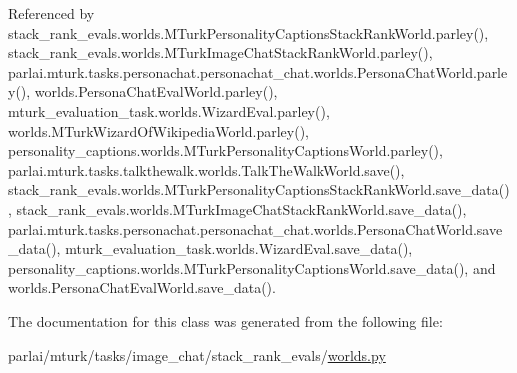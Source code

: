 Referenced by stack\+\_\+rank\+\_\+evals.\+worlds.\+M\+Turk\+Personality\+Captions\+Stack\+Rank\+World.\+parley(), stack\+\_\+rank\+\_\+evals.\+worlds.\+M\+Turk\+Image\+Chat\+Stack\+Rank\+World.\+parley(), parlai.\+mturk.\+tasks.\+personachat.\+personachat\+\_\+chat.\+worlds.\+Persona\+Chat\+World.\+parley(), worlds.\+Persona\+Chat\+Eval\+World.\+parley(), mturk\+\_\+evaluation\+\_\+task.\+worlds.\+Wizard\+Eval.\+parley(), worlds.\+M\+Turk\+Wizard\+Of\+Wikipedia\+World.\+parley(), personality\+\_\+captions.\+worlds.\+M\+Turk\+Personality\+Captions\+World.\+parley(), parlai.\+mturk.\+tasks.\+talkthewalk.\+worlds.\+Talk\+The\+Walk\+World.\+save(), stack\+\_\+rank\+\_\+evals.\+worlds.\+M\+Turk\+Personality\+Captions\+Stack\+Rank\+World.\+save\+\_\+data(), stack\+\_\+rank\+\_\+evals.\+worlds.\+M\+Turk\+Image\+Chat\+Stack\+Rank\+World.\+save\+\_\+data(), parlai.\+mturk.\+tasks.\+personachat.\+personachat\+\_\+chat.\+worlds.\+Persona\+Chat\+World.\+save\+\_\+data(), mturk\+\_\+evaluation\+\_\+task.\+worlds.\+Wizard\+Eval.\+save\+\_\+data(), personality\+\_\+captions.\+worlds.\+M\+Turk\+Personality\+Captions\+World.\+save\+\_\+data(), and worlds.\+Persona\+Chat\+Eval\+World.\+save\+\_\+data().



The documentation for this class was generated from the following file\+:\begin{DoxyCompactItemize}
\item 
parlai/mturk/tasks/image\+\_\+chat/stack\+\_\+rank\+\_\+evals/\hyperlink{parlai_2mturk_2tasks_2image__chat_2stack__rank__evals_2worlds_8py}{worlds.\+py}\end{DoxyCompactItemize}
